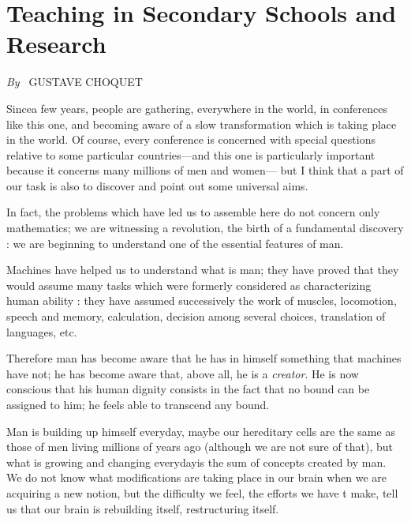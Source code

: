 \chapter{Teaching in Secondary Schools and Research}

\begin{center}
{\em By~} GUSTAVE CHOQUET
\end{center}

\setcounter{pageoriginal}{44}
Since\pageoriginale a few years, people are gathering, everywhere in the world, in conferences like this one, and becoming aware of a slow transformation which is taking place in the world. Of course, every conference is concerned with special questions relative to some particular countries---and this one is particularly important because it concerns many millions of men and women--- but I think that a part of our task is also to discover and point out some universal aims.

In fact, the problems which have led us to assemble here do not concern only mathematics; we are witnessing a revolution, the birth of a fundamental discovery : we are beginning to understand one of the essential features of man.

Machines have helped us to understand what is man; they have proved that they would assume many tasks which were formerly considered as characterizing human ability : they have assumed successively the work of muscles, locomotion, speech and memory, calculation, decision among several choices, translation of languages, etc.

Therefore man has become aware that he has in himself something that machines have not; he has become aware that, above all, he is a {\em creator}. He is now conscious that his human dignity consists in the fact that no bound can be assigned to him; he feels able to transcend any bound.

Man is building up himself everyday, maybe our hereditary cells are the same as those of men living millions of years ago (although we are not sure of that), but what is growing and changing everyday\pageoriginale is the sum of concepts created by man. We do not know what modifications are taking place in our brain when we are acquiring a new notion, but the difficulty we feel, the efforts we have t make, tell us that our brain is rebuilding itself, restructuring itself.

